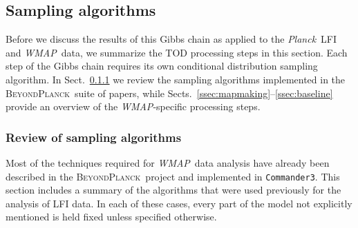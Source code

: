 \documentclass[twocolumn]{../../common/aa}
\def\WMAP{\emph{WMAP}}
\def\Planck{\emph{Planck}}
\def\commanderthree{\texttt{Commander3}}
\newcommand{\bp}{\textsc{BeyondPlanck}}
\begin{document}





\subsection{Sampling algorithms}
\label{sec:algorithms}

Before we discuss the results of this Gibbs chain as applied to the \Planck\ LFI and \WMAP\ data, we summarize the TOD processing steps in this section. Each step of the Gibbs chain requires its own conditional distribution sampling algorithm. In Sect.~\ref{ssec:oldsamplers} we review the sampling algorithms implemented in the \bp\ suite of papers, while Sects.~\ref{ssec:mapmaking}--\ref{ssec:baseline} provide an overview of the \WMAP-specific processing steps.

\subsubsection{Review of sampling algorithms}
\label{ssec:oldsamplers}


Most of the techniques required for \WMAP\ data analysis have already been  described in the \bp\ project and implemented in \commanderthree. This section includes a summary of the algorithms that were used previously for the analysis of LFI data. In each of these cases, every part of the model not explicitly mentioned is held fixed unless specified otherwise.
\end{document}
